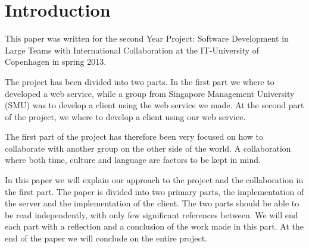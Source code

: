\section{Introduction}
This paper was written for the second Year Project: Software Development in Large Teams with International Collaboration at the IT-University of Copenhagen in spring 2013.

The project has been divided into two parts. In the first part we where to developed a web service, while a group from Singapore Management University (SMU) was to develop a client using the web service we made. At the second part of the project, we where to develop a client using our web service.

The first part of the project has therefore been very focused on how to collaborate with another group on the other side of the world. A collaboration where both time, culture and language are factors to be kept in mind.

In this paper we will explain our approach to the project and the collaboration in the first part.
The paper is divided into two primary parts, the implementation of the server and the implementation of the client.
The two parts should be able to be read independently, with only few significant references between. We will end each part with a reflection and a conclusion of the work made in this part.
At the end of the paper we will conclude on the entire project.
\newpage